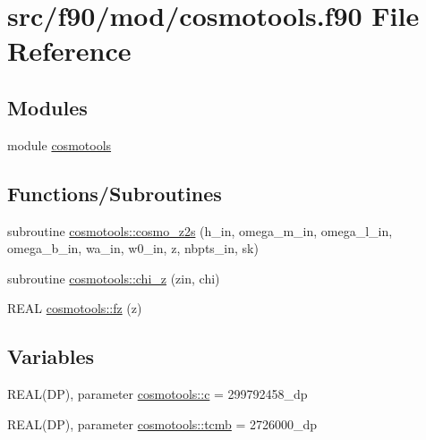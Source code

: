 \hypertarget{cosmotools_8f90}{
\section{src/f90/mod/cosmotools.f90 File Reference}
\label{cosmotools_8f90}
}
\subsection*{Modules}
\begin{DoxyCompactItemize}
\item 
module \hyperlink{namespacecosmotools}{cosmotools}
\end{DoxyCompactItemize}
\subsection*{Functions/Subroutines}
\begin{DoxyCompactItemize}
\item 
subroutine \hyperlink{namespacecosmotools_a0f920067de929a7b9ec895e881751483}{cosmotools::cosmo\_\-z2s} (h\_\-in, omega\_\-m\_\-in, omega\_\-l\_\-in, omega\_\-b\_\-in, wa\_\-in, w0\_\-in, z, nbpts\_\-in, sk)
\item 
subroutine \hyperlink{namespacecosmotools_ab39be67e673296c9e6586952f5e6c181}{cosmotools::chi\_\-z} (zin, chi)
\item 
REAL \hyperlink{namespacecosmotools_a681aca576953f69092d54f5474c18c2b}{cosmotools::fz} (z)
\end{DoxyCompactItemize}
\subsection*{Variables}
\begin{DoxyCompactItemize}
\item 
REAL(DP), parameter \hyperlink{namespacecosmotools_af8ddc547a2b8ba207873dbc3e349b2c8}{cosmotools::c} = 299792458\_\-dp
\item 
REAL(DP), parameter \hyperlink{namespacecosmotools_a80c53b710983b0f2be212c0fcbed9add}{cosmotools::tcmb} = 2726000\_\-dp
\end{DoxyCompactItemize}
